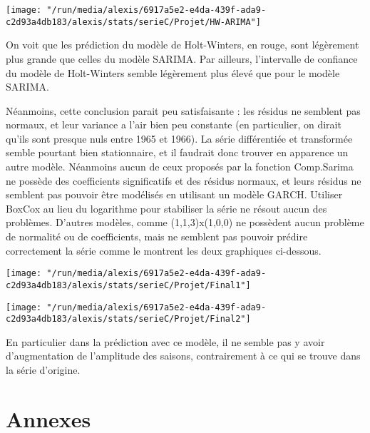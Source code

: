\documentclass[11pt,a4paper]{article}
\begin{document}
\begin{center}
\texttt{[image: "/run/media/alexis/6917a5e2-e4da-439f-ada9-c2d93a4db183/alexis/stats/serieC/Projet/HW-ARIMA"]}
\end{center}

On voit que les prédiction du modèle de Holt-Winters, en rouge, sont légèrement plus grande que celles du modèle SARIMA. Par ailleurs, l'intervalle de confiance du modèle de Holt-Winters semble légèrement plus élevé que pour le modèle SARIMA.

Néanmoins, cette conclusion parait peu satisfaisante : les résidus ne semblent pas normaux, et leur variance a l'air bien peu constante (en particulier, on dirait qu'ils sont presque nuls entre 1965 et 1966). La série différentiée et transformée semble pourtant bien stationnaire, et il faudrait donc trouver en apparence un autre modèle. Néanmoins aucun de ceux proposés par la fonction Comp.Sarima ne possède des coefficients significatifs et des résidus normaux, et leurs résidus ne semblent pas pouvoir être modélisés en utilisant un modèle GARCH. Utiliser BoxCox au lieu du logarithme pour stabiliser la série ne résout aucun des problèmes. D'autres modèles, comme (1,1,3)x(1,0,0) ne possèdent aucun problème de normalité ou de coefficients, mais ne semblent pas pouvoir prédire correctement la série comme le montrent les deux graphiques ci-dessous.

\begin{center}
\texttt{[image: "/run/media/alexis/6917a5e2-e4da-439f-ada9-c2d93a4db183/alexis/stats/serieC/Projet/Final1"]}
\end{center}


\begin{center}
\texttt{[image: "/run/media/alexis/6917a5e2-e4da-439f-ada9-c2d93a4db183/alexis/stats/serieC/Projet/Final2"]}
\end{center}

En particulier dans la prédiction avec ce modèle, il ne semble pas y avoir d'augmentation de l'amplitude des saisons, contrairement à ce qui se trouve dans la série d'origine.
\section{Annexes}
\end{document}
